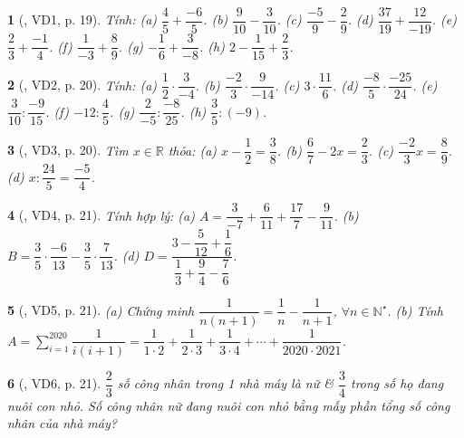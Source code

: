\documentclass{article}
\newtheorem{baitoan}{}
\begin{document}
\begin{baitoan}[\cite{Binh_boi_duong_Toan_6_tap_2}, VD1, p. 19]
	Tính: (a) $\dfrac{4}{5} + \dfrac{-6}{5}$. (b) $\dfrac{9}{10} - \dfrac{3}{10}$. (c) $\dfrac{-5}{9} - \dfrac{2}{9}$. (d) $\dfrac{37}{19} + \dfrac{12}{-19}$. (e) $\dfrac{2}{3} + \dfrac{-1}{4}$. (f) $\dfrac{1}{-3} + \dfrac{8}{9}$. (g) $-\dfrac{1}{6} + \dfrac{3}{-8}$. (h) $2 - \dfrac{1}{15} + \dfrac{2}{3}$.
\end{baitoan}

\begin{baitoan}[\cite{Binh_boi_duong_Toan_6_tap_2}, VD2, p. 20]
	Tính: (a) $\dfrac{1}{2}\cdot\dfrac{3}{-4}$. (b) $\dfrac{-2}{3}\cdot\dfrac{9}{-14}$. (c) $3\cdot\dfrac{11}{6}$. (d) $\dfrac{-8}{5}\cdot\dfrac{-25}{24}$. (e) $\dfrac{3}{10}:\dfrac{-9}{15}$. (f) $-12:\dfrac{4}{5}$. (g) $\dfrac{2}{-5}:\dfrac{-8}{25}$. (h) $\dfrac{3}{5}:(-9)$.
\end{baitoan}

\begin{baitoan}[\cite{Binh_boi_duong_Toan_6_tap_2}, VD3, p. 20]
	Tìm $x\in\mathbb{R}$ thỏa: (a) $x - \dfrac{1}{2} = \dfrac{3}{8}$. (b) $\dfrac{6}{7} - 2x = \dfrac{2}{3}$. (c) $\dfrac{-2}{3}x = \dfrac{8}{9}$. (d) $x:\dfrac{24}{5} = \dfrac{-5}{4}$.
\end{baitoan}

\begin{baitoan}[\cite{Binh_boi_duong_Toan_6_tap_2}, VD4, p. 21]
	Tính hợp lý: (a) $A = \dfrac{3}{-7} + \dfrac{6}{11} + \dfrac{17}{7} - \dfrac{9}{11}$. (b) $B = \dfrac{3}{5}\cdot\dfrac{-6}{13} - \dfrac{3}{5}\cdot\dfrac{7}{13}$. (d) $D = \dfrac{3 - \dfrac{5}{12} + \dfrac{1}{6}}{\dfrac{1}{3} + \dfrac{9}{4} - \dfrac{7}{6}}$.
\end{baitoan}

\begin{baitoan}[\cite{Binh_boi_duong_Toan_6_tap_2}, VD5, p. 21]
	(a) Chứng minh $\dfrac{1}{n(n + 1)} = \dfrac{1}{n} - \dfrac{1}{n + 1}$, $\forall n\in\mathbb{N}^\star$. (b) Tính $A = \sum_{i=1}^{2020} \dfrac{1}{i(i + 1)} = \dfrac{1}{1\cdot2} + \dfrac{1}{2\cdot3} + \dfrac{1}{3\cdot4} + \cdots + \dfrac{1}{2020\cdot2021}$.
\end{baitoan}

\begin{baitoan}[\cite{Binh_boi_duong_Toan_6_tap_2}, VD6, p. 21]
	$\dfrac{2}{3}$ số công nhân trong 1 nhà máy là nữ \& $\dfrac{3}{4}$ trong số họ đang nuôi con nhỏ. Số công nhân nữ đang nuôi con nhỏ bằng mấy phần tổng số công nhân của nhà máy?
\end{baitoan}
\end{document}
